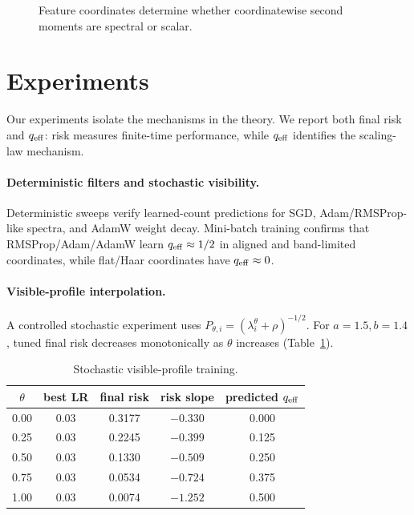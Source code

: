 \documentclass{article}
\begin{document}
\begin{figure}[t]
\centering
{}
\caption{Feature coordinates determine whether coordinatewise second moments are spectral or scalar.}
\label{fig:qeff-regimes}
\end{figure}

\section{Experiments}
Our experiments isolate the mechanisms in the theory.  We report both final risk and $q_{\rm eff}$: risk measures finite-time performance, while $q_{\rm eff}$ identifies the scaling-law mechanism.

\paragraph{Deterministic filters and stochastic visibility.} Deterministic sweeps verify learned-count predictions for SGD, Adam/RMSProp-like spectra, and AdamW weight decay.  Mini-batch training confirms that RMSProp/Adam/AdamW learn $q_{\rm eff}\approx1/2$ in aligned and band-limited coordinates, while flat/Haar coordinates have $q_{\rm eff}\approx0$.

\paragraph{Visible-profile interpolation.} A controlled stochastic experiment uses $P_{\theta,i}=(\lambda_i^\theta+\rho)^{-1/2}$.  For $a=1.5,b=1.4$, tuned final risk decreases monotonically as $\theta$ increases (Table~\ref{tab:theta}).

\begin{table}[t]
\centering
\caption{Stochastic visible-profile training.}
\label{tab:theta}
\begin{tabular}{ccccc}
\toprule
$\theta$ & best LR & final risk & risk slope & predicted $q_{\rm eff}$ \\
\midrule
0.00 & 0.03 & 0.3177 & $-0.330$ & 0.000 \\
0.25 & 0.03 & 0.2245 & $-0.399$ & 0.125 \\
0.50 & 0.03 & 0.1330 & $-0.509$ & 0.250 \\
0.75 & 0.03 & 0.0534 & $-0.724$ & 0.375 \\
1.00 & 0.03 & 0.0074 & $-1.252$ & 0.500 \\
\bottomrule
\end{tabular}
\end{table}
\end{document}
